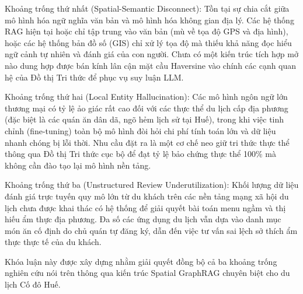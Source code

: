 Khoảng trống thứ nhất (Spatial-Semantic Disconnect): Tồn tại sự chia cắt giữa mô hình hóa ngữ nghĩa văn bản và mô hình hóa không gian địa lý. Các hệ thống RAG hiện tại hoặc chỉ tập trung vào văn bản (mù về tọa độ GPS và địa hình), hoặc các hệ thống bản đồ số (GIS) chỉ xử lý tọa độ mà thiếu khả năng đọc hiểu ngữ cảnh tự nhiên và đánh giá của con người. Chưa có một kiến trúc tích hợp mở nào dung hợp được bán kính lân cận mặt cầu Haversine vào chính các cạnh quan hệ của Đồ thị Tri thức để phục vụ suy luận LLM.

Khoảng trống thứ hai (Local Entity Hallucination): Các mô hình ngôn ngữ lớn thương mại có tỷ lệ ảo giác rất cao đối với các thực thể du lịch cấp địa phương (đặc biệt là các quán ăn dân dã, ngõ hẻm lịch sử tại Huế), trong khi việc tinh chỉnh (fine-tuning) toàn bộ mô hình đòi hỏi chi phí tính toán lớn và dữ liệu nhanh chóng bị lỗi thời. Nhu cầu đặt ra là một cơ chế neo giữ tri thức thực thể thông qua Đồ thị Tri thức cục bộ để đạt tỷ lệ bảo chứng thực thể 100\% mà không cần đào tạo lại mô hình nền tảng.

Khoảng trống thứ ba (Unstructured Review Underutilization): Khối lượng dữ liệu đánh giá trực tuyến quy mô lớn từ du khách trên các nền tảng mạng xã hội du lịch chưa được khai thác có hệ thống để giải quyết bài toán menu ngầm và thị hiếu ẩm thực địa phương. Đa số các ứng dụng du lịch vẫn dựa vào danh mục món ăn cố định do chủ quán tự đăng ký, dẫn đến việc tư vấn sai lệch sở thích ẩm thực thực tế của du khách.

Khóa luận này được xây dựng nhằm giải quyết đồng bộ cả ba khoảng trống nghiên cứu nói trên thông qua kiến trúc Spatial GraphRAG chuyên biệt cho du lịch Cố đô Huế.
